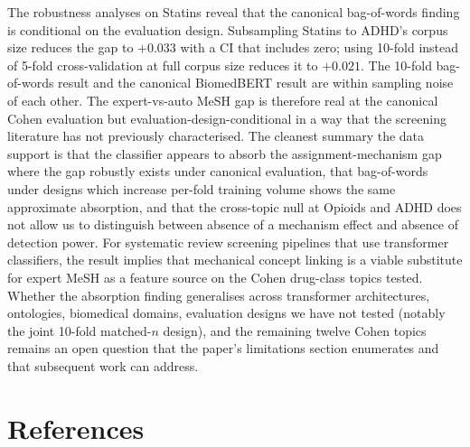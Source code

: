 \documentclass[11pt,a4paper]{article}
\begin{document}
The robustness analyses on Statins reveal that the canonical bag-of-words finding is conditional on the evaluation design. Subsampling Statins to ADHD's corpus size reduces the gap to $+0.033$ with a CI that includes zero; using 10-fold instead of 5-fold cross-validation at full corpus size reduces it to $+0.021$. The 10-fold bag-of-words result and the canonical BiomedBERT result are within sampling noise of each other. The expert-vs-auto MeSH gap is therefore real at the canonical Cohen evaluation but evaluation-design-conditional in a way that the screening literature has not previously characterised. The cleanest summary the data support is that the classifier appears to absorb the assignment-mechanism gap where the gap robustly exists under canonical evaluation, that bag-of-words under designs which increase per-fold training volume shows the same approximate absorption, and that the cross-topic null at Opioids and ADHD does not allow us to distinguish between absence of a mechanism effect and absence of detection power. For systematic review screening pipelines that use transformer classifiers, the result implies that mechanical concept linking is a viable substitute for expert MeSH as a feature source on the Cohen drug-class topics tested. Whether the absorption finding generalises across transformer architectures, ontologies, biomedical domains, evaluation designs we have not tested (notably the joint 10-fold matched-$n$ design), and the remaining twelve Cohen topics remains an open question that the paper's limitations section enumerates and that subsequent work can address.

\section*{References}
\end{document}
